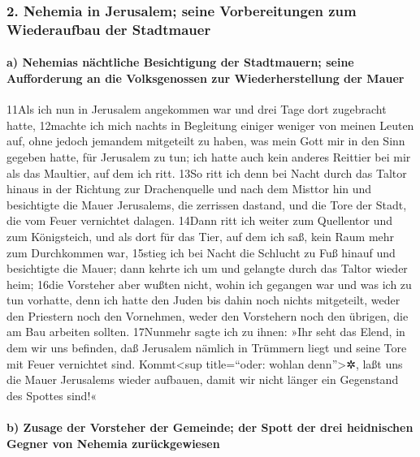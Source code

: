 \hypertarget{nehemia-in-jerusalem-seine-vorbereitungen-zum-wiederaufbau-der-stadtmauer}{%
\subsubsection{2. Nehemia in Jerusalem; seine Vorbereitungen zum
Wiederaufbau der
Stadtmauer}\label{nehemia-in-jerusalem-seine-vorbereitungen-zum-wiederaufbau-der-stadtmauer}}

\hypertarget{a-nehemias-nuxe4chtliche-besichtigung-der-stadtmauern-seine-aufforderung-an-die-volksgenossen-zur-wiederherstellung-der-mauer}{%
\paragraph{a) Nehemias nächtliche Besichtigung der Stadtmauern; seine
Aufforderung an die Volksgenossen zur Wiederherstellung der
Mauer}\label{a-nehemias-nuxe4chtliche-besichtigung-der-stadtmauern-seine-aufforderung-an-die-volksgenossen-zur-wiederherstellung-der-mauer}}

11Als ich nun in Jerusalem angekommen war und drei Tage dort zugebracht
hatte, 12machte ich mich nachts in Begleitung einiger weniger von meinen
Leuten auf, ohne jedoch jemandem mitgeteilt zu haben, was mein Gott mir
in den Sinn gegeben hatte, für Jerusalem zu tun; ich hatte auch kein
anderes Reittier bei mir als das Maultier, auf dem ich ritt. 13So ritt
ich denn bei Nacht durch das Taltor hinaus in der Richtung zur
Drachenquelle und nach dem Misttor hin und besichtigte die Mauer
Jerusalems, die zerrissen dastand, und die Tore der Stadt, die vom Feuer
vernichtet dalagen. 14Dann ritt ich weiter zum Quellentor und zum
Königsteich, und als dort für das Tier, auf dem ich saß, kein Raum mehr
zum Durchkommen war, 15stieg ich bei Nacht die Schlucht zu Fuß hinauf
und besichtigte die Mauer; dann kehrte ich um und gelangte durch das
Taltor wieder heim; 16die Vorsteher aber wußten nicht, wohin ich
gegangen war und was ich zu tun vorhatte, denn ich hatte den Juden bis
dahin noch nichts mitgeteilt, weder den Priestern noch den Vornehmen,
weder den Vorstehern noch den übrigen, die am Bau arbeiten sollten.
17Nunmehr sagte ich zu ihnen: »Ihr seht das Elend, in dem wir uns
befinden, daß Jerusalem nämlich in Trümmern liegt und seine Tore mit
Feuer vernichtet sind. Kommt\textless sup title=``oder: wohlan
denn''\textgreater✲, laßt uns die Mauer Jerusalems wieder aufbauen,
damit wir nicht länger ein Gegenstand des Spottes sind!«

\hypertarget{b-zusage-der-vorsteher-der-gemeinde-der-spott-der-drei-heidnischen-gegner-von-nehemia-zuruxfcckgewiesen}{%
\paragraph{b) Zusage der Vorsteher der Gemeinde; der Spott der drei
heidnischen Gegner von Nehemia
zurückgewiesen}\label{b-zusage-der-vorsteher-der-gemeinde-der-spott-der-drei-heidnischen-gegner-von-nehemia-zuruxfcckgewiesen}}

